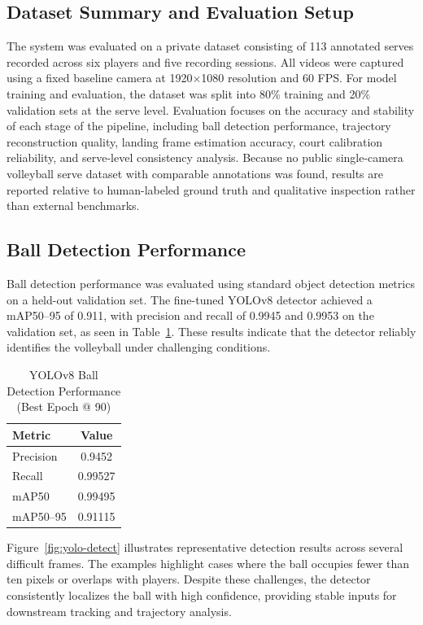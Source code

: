 \subsection{Dataset Summary and Evaluation Setup}
The system was evaluated on a private dataset consisting of 113 annotated serves recorded across six players and five recording sessions. All videos were captured using a fixed baseline camera at 1920$\times$1080 resolution and 60 FPS. For model training and evaluation, the dataset was split into 80\% training and 20\% validation sets at the serve level. Evaluation focuses on the accuracy and stability of each stage of the pipeline, including ball detection performance, trajectory reconstruction quality, landing frame estimation accuracy, court calibration reliability, and serve-level consistency analysis. Because no public single-camera volleyball serve dataset with comparable annotations was found, results are reported relative to human-labeled ground truth and qualitative inspection rather than external benchmarks.

\subsection{Ball Detection Performance}
Ball detection performance was evaluated using standard object detection metrics on a held-out validation set. The fine-tuned YOLOv8 detector achieved a mAP50--95 of 0.911, with precision and recall of 0.9945 and 0.9953 on the validation set, as seen in Table~\ref{tab:yolo-performance}. These results indicate that the detector reliably identifies the volleyball under challenging conditions.

\begin{table}[!t]
    \renewcommand{\arraystretch}{1.5}
    \caption{YOLOv8 Ball Detection Performance (Best Epoch @ 90)}
    \label{tab:yolo-performance}
    \centering
    \normalsize 
    \begin{tabular}{l c}
    \hline
    \textbf{Metric} & \textbf{Value} \\
    \hline
    Precision & 0.9452 \\
    Recall & 0.99527 \\
    mAP50 & 0.99495 \\
    mAP50--95 & 0.91115 \\
    \hline
    \end{tabular}
    \normalsize
    \end{table}

Figure~\ref{fig:yolo-detect} illustrates representative detection results across several difficult frames. The examples highlight cases where the ball occupies fewer than ten pixels or overlaps with players. Despite these challenges, the detector consistently localizes the ball with high confidence, providing stable inputs for downstream tracking and trajectory analysis.

